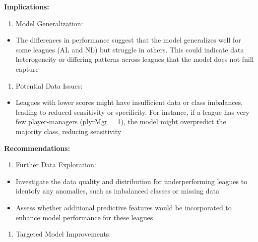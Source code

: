 \documentclass[
]{article}
\providecommand{\tightlist}{%
  \setlength{\itemsep}{0pt}\setlength{\parskip}{0pt}}
\begin{document}
\textbf{Implications:}

\begin{enumerate}
\def\labelenumi{\arabic{enumi}.}
\tightlist
\item
  Model Generalization:
\end{enumerate}

\begin{itemize}
\tightlist
\item
  The differences in performance suggest that the model generalizes well
  for some leagues (AL and NL) but struggle in others. This could
  indicate data heterogeneity or differing patterns across leagues that
  the model does not fuill capture
\end{itemize}

\begin{enumerate}
\def\labelenumi{\arabic{enumi}.}
\setcounter{enumi}{1}
\tightlist
\item
  Potential Data Issues:
\end{enumerate}

\begin{itemize}
\tightlist
\item
  Leagues with lower scores might have insufficient data or class
  imbalances, leading to reduced sensitivity or specificity. For
  instance, if a league has very few player-managers (plyrMgr = 1), the
  model might overpredict the majority class, reducing sensitivity
\end{itemize}

\textbf{Recommendations:}

\begin{enumerate}
\def\labelenumi{\arabic{enumi}.}
\tightlist
\item
  Further Data Exploration:
\end{enumerate}

\begin{itemize}
\item
  Investigate the data quality and distribution for underperforming
  leagues to identofy any anomalies, such as imbalanced classes or
  missing data
\item
  Assess whether additional predictive features would be incorporated to
  enhance model performance for these leagues
\end{itemize}

\begin{enumerate}
\def\labelenumi{\arabic{enumi}.}
\setcounter{enumi}{1}
\tightlist
\item
  Targeted Model Improvements:
\end{enumerate}
\end{document}
